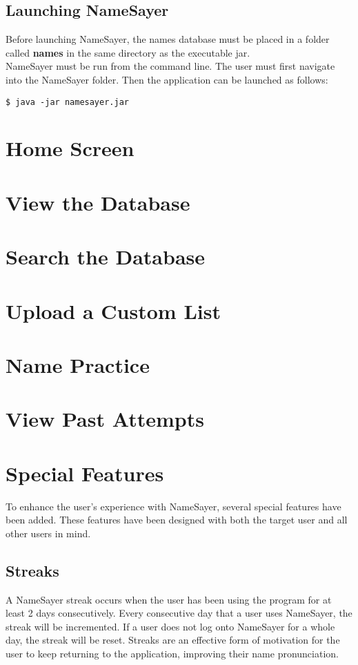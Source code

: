 \documentclass{article}
\begin{document}
\subsection{Launching NameSayer}
Before launching NameSayer, the names database must be placed in a folder called \textbf{names} in the same directory as 
the executable jar. \\

NameSayer must be run from the command line. The user must first navigate into the NameSayer folder. Then the application
can be launched as follows: 

\begin{verbatim}
$ java -jar namesayer.jar
\end{verbatim}

\section{Home Screen}

\section{View the Database}

\section{Search the Database}

\section{Upload a Custom List}

\section{Name Practice}

\section{View Past Attempts}

\section{Special Features}
To enhance the user's experience with NameSayer, several special features have been added. These features have been designed
with both the target user and all other users in mind.

\subsection{Streaks}
A NameSayer streak occurs when the user has been using the program for at least 2 days consecutively. Every consecutive day 
that a user uses NameSayer, the streak will be incremented. If a user does not log onto NameSayer for a whole day, the 
streak will be reset. Streaks are an effective form of motivation for the user to keep returning to the application, 
improving their name pronunciation. \\
\end{document}
